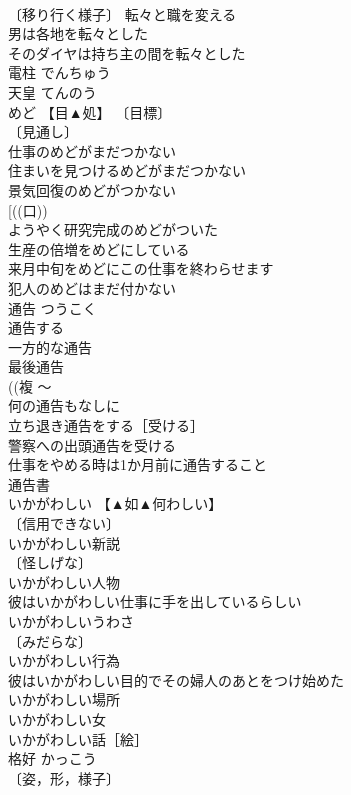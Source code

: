 \documentclass[8pt]{extreport}
\begin{document}
\begin{CJK}{UTF8}{min}
\\	〔移り行く様子〕 転々と職を変える 
\\	男は各地を転々とした 
\\	そのダイヤは持ち主の間を転々とした 
\\	電柱	でんちゅう	
\\	天皇	てんのう	
\\	めど	【目▲処】	〔目標〕
\\	〔見通し〕
\\	仕事のめどがまだつかない 
\\	住まいを見つけるめどがまだつかない 
\\	景気回復のめどがつかない 
\\	[((口)) 
\\	ようやく研究完成のめどがついた 
\\	生産の倍増をめどにしている 
\\	来月中旬をめどにこの仕事を終わらせます 
\\	犯人のめどはまだ付かない 
\\	通告	つうこく	
\\	通告する 
\\	一方的な通告 
\\	最後通告 
\\	((複 〜
\\	何の通告もなしに 
\\	立ち退き通告をする［受ける］ 
\\	警察への出頭通告を受ける 
\\	仕事をやめる時は1か月前に通告すること 
\\	通告書 
\\	いかがわしい	【▲如▲何わしい】	
\\	〔信用できない〕
\\	いかがわしい新説 
\\	〔怪しげな〕
\\	いかがわしい人物 
\\	彼はいかがわしい仕事に手を出しているらしい 
\\	いかがわしいうわさ 
\\	〔みだらな〕
\\	いかがわしい行為 
\\	彼はいかがわしい目的でその婦人のあとをつけ始めた 
\\	いかがわしい場所 
\\	いかがわしい女 
\\	いかがわしい話［絵］ 
\\	格好	かっこう	
\\	〔姿，形，様子〕

\end{CJK}
\end{document}
